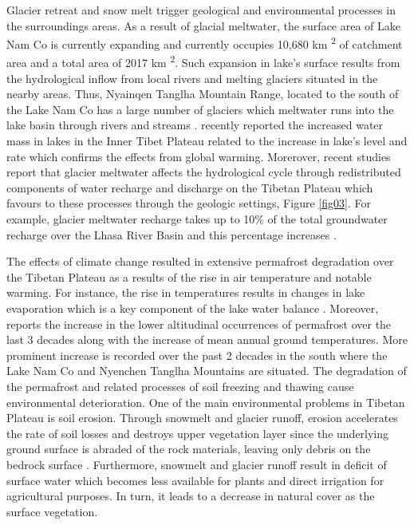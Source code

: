 \documentclass[final,5p,times,twocolumn]{elsarticle}
\begin{document}
Glacier retreat and snow melt trigger geological and environmental processes in the surroundings areas. As a result of glacial meltwater, the surface area of Lake Nam Co is currently expanding and currently occupies 10,680 km \textsuperscript{2} of catchment area and a total area of 2017 km \textsuperscript{2}. Such expansion in lake's surface results from the hydrological inflow from local rivers and melting glaciers situated in the nearby areas. Thus, Nyainqen Tanglha Mountain Range, located to the south of the Lake Nam Co has a large number of glaciers which meltwater runs into the lake basin through rivers and streams \cite{ZHOU201389}. \cite{Zhangetal2013} recently reported the increased water mass in lakes in the Inner Tibet Plateau related to the increase in lake's level and rate which confirms the effects from global warming. Morerover, recent studies report that glacier meltwater affects the hydrological cycle through redistributed components of water recharge and discharge on the Tibetan Plateau \cite{HE2024130556} which favours to these processes through the geologic settings, Figure \ref{fig03}. For example, glacier meltwater recharge takes up to 10\% of the total groundwater recharge over the Lhasa River Basin and this percentage increases \cite{CHEN2021100871}. 

The effects of climate change resulted in extensive permafrost degradation over the Tibetan Plateau as a results of the rise in air temperature and notable warming. For instance, the rise in temperatures results in changes in lake evaporation which is a key component of the lake water balance \cite{2015JD024523}. Moreover, \cite{YANG201031} reports the increase in the lower altitudinal occurrences of permafrost over the last 3 decades along with the increase of mean annual ground temperatures. More prominent increase is recorded over the past 2 decades in the south where the Lake Nam Co and Nyenchen Tanglha Mountains are situated. The degradation of the permafrost and related processes of soil freezing and thawing  cause environmental deterioration. One of the main environmental problems in Tibetan Plateau is soil erosion. Through snowmelt and glacier runoff, erosion accelerates the rate of soil losses and destroys upper vegetation layer since the underlying ground surface is abraded of the rock materials, leaving only debris on the bedrock surface \cite{LI2024107695}. Furthermore, snowmelt and glacier runoff result in deficit of surface water which becomes less available for plants and direct irrigation for agricultural purposes. In turn, it leads to a decrease in natural cover as the surface vegetation. 
\end{document}
